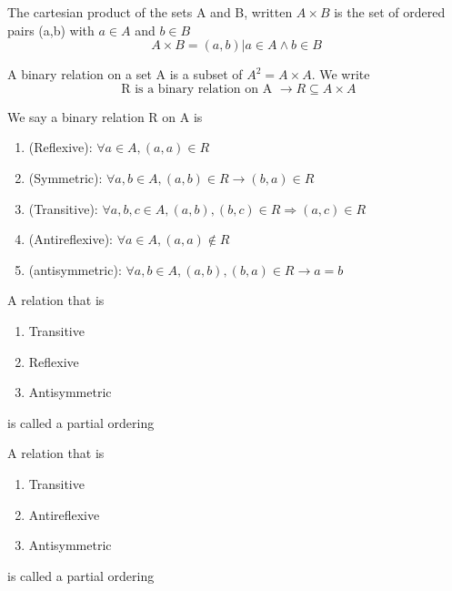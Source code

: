 \documentclass{article}
\begin{document}
\begin{definition}
    The cartesian product of the sets A and B, written $ A \times {B}$
    is the set of ordered pairs (a,b) with $a \in A$ and $b \in B$
    $$ A \times {B} = {(a,b) | a \in A \land b \in B} $$
\end{definition}

\begin{definition}
    A binary relation on a set A is a subset of $A^2 = A \times {A}$. We
    write $$ \text{ R is a binary relation on A } \longrightarrow {R \subseteq A \times {A}} $$
\end{definition}

\begin{remark}

\end{remark}

\begin{proposition}
    We say a binary relation R on A is
    \begin{enumerate}
	\item (Reflexive): $\forall a \in A, (a,a) \in R$
	\item (Symmetric): $\forall a,b \in A, (a,b) \in R \longrightarrow
	    (b,a) \in R$
	\item (Transitive): $\forall a,b,c \in A, (a,b), (b,c) \in R
	    \Longrightarrow (a,c) \in R$
	\item (Antireflexive): $\forall a \in A, (a,a) \not\in R$
	\item (antisymmetric): $\forall a,b \in A, (a,b), (b,a) \in R
	    \longrightarrow a=b$
    \end{enumerate}
\end{proposition}

\begin{definition}
    A relation that is
    \begin{enumerate}
        \item Transitive
	\item Reflexive
	\item Antisymmetric
    \end{enumerate}
    is called a partial ordering
\end{definition}

\begin{definition}
    A relation that is
    \begin{enumerate}
        \item Transitive
	\item Antireflexive
	\item Antisymmetric
    \end{enumerate}
    is called a partial ordering
\end{definition}
\end{document}
